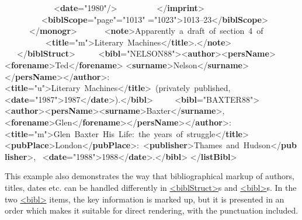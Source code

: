 \begin{shaded}
            {<\textbf{date}\hspace*{1em}{when}="{1980}"/>}\newline
         {</\textbf{imprint}>}\newline
         {<\textbf{biblScope}\hspace*{1em}{unit}="{page}"\hspace*{1em}{from}="{1013}"\mbox{}\newline 
\hspace*{1em}{to}="{1023}">}1013–23{</\textbf{biblScope}>}\newline
      {</\textbf{monogr}>}\newline
      {<\textbf{note}>}Apparently a draft of section 4 of \newline
          {<\textbf{title}\hspace*{1em}{level}="{m}">}Literary Machines{</\textbf{title}>}.{</\textbf{note}>}\newline
   {</\textbf{biblStruct}>}   \newline
\newline
  {<\textbf{bibl}\hspace*{1em}{xml:id}="{NELSON88}">}{<\textbf{author}>}{<\textbf{persName}>}{<\textbf{forename}>}Ted{</\textbf{forename}>}\newline
{<\textbf{surname}>}Nelson{</\textbf{surname}>}{</\textbf{persName}>}{</\textbf{author}>}: \newline
{<\textbf{title}\hspace*{1em}{level}="{u}">}Literary Machines{</\textbf{title}>} (privately published, \newline
{<\textbf{date}\hspace*{1em}{when}="{1987}">}1987{</\textbf{date}>}).{</\textbf{bibl}>}\newline
  \newline
  {<\textbf{bibl}\hspace*{1em}{xml:id}="{BAXTER88}">}{<\textbf{author}>}{<\textbf{persName}>}{<\textbf{surname}>}Baxter{</\textbf{surname}>}, \newline
{<\textbf{forename}>}Glen{</\textbf{forename}>}{</\textbf{persName}>}{</\textbf{author}>}:\newline
{<\textbf{title}\hspace*{1em}{level}="{m}">}Glen Baxter His Life: the years of struggle{</\textbf{title}>} \newline
{<\textbf{pubPlace}>}London{</\textbf{pubPlace}>}: {<\textbf{publisher}>}Thames and Hudson{</\textbf{publisher}>}, \newline
{<\textbf{date}\hspace*{1em}{when}="{1988}">}1988{</\textbf{date}>}.{</\textbf{bibl}>}\newline
{</\textbf{listBibl}>}\end{shaded}\egroup\par \noindent  This example also demonstrates the way that bibliographical markup of authors, titles, dates etc. can be handled differently in \hyperref[TEI.biblStruct]{<biblStruct>}s and \hyperref[TEI.bibl]{<bibl>}s. In the two \hyperref[TEI.bibl]{<bibl>} items, the key information is marked up, but it is presented in an order which makes it suitable for direct rendering, with the punctuation included.\par
